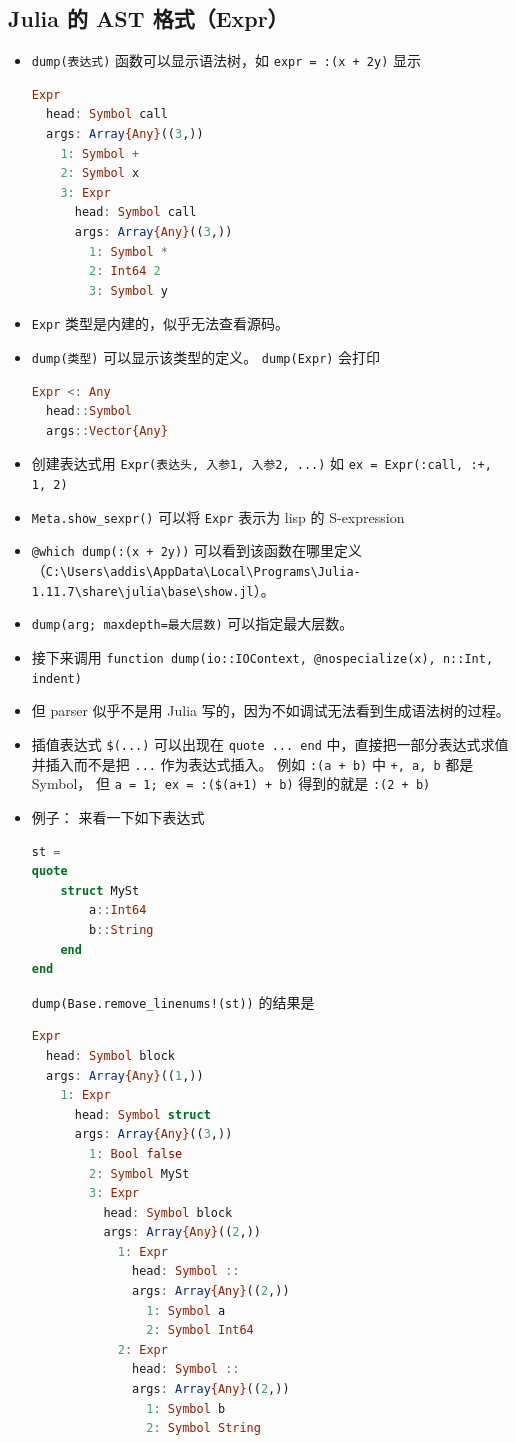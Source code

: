 \subsection{Julia 的 AST 格式（Expr）}
\begin{itemize}
\item \verb`dump(表达式)` 函数可以显示语法树，如 \verb`expr = :(x + 2y)` 显示
\begin{lstlisting}[language=julia]
Expr
  head: Symbol call
  args: Array{Any}((3,))
    1: Symbol +
    2: Symbol x
    3: Expr
      head: Symbol call
      args: Array{Any}((3,))
        1: Symbol *
        2: Int64 2
        3: Symbol y
\end{lstlisting}
\item \verb`Expr` 类型是内建的，似乎无法查看源码。
\item \verb`dump(类型)` 可以显示该类型的定义。 \verb`dump(Expr)` 会打印 
\begin{lstlisting}[language=julia]
Expr <: Any
  head::Symbol
  args::Vector{Any}
\end{lstlisting}
\item 创建表达式用 \verb`Expr(表达头, 入参1, 入参2, ...)` 如 \verb`ex = Expr(:call, :+, 1, 2)`
\item \verb`Meta.show_sexpr()` 可以将 \verb`Expr` 表示为 lisp 的 S-expression
\item \verb`@which dump(:(x + 2y))` 可以看到该函数在哪里定义（\verb`C:\Users\addis\AppData\Local\Programs\Julia-1.11.7\share\julia\base\show.jl`）。
\item \verb`dump(arg; maxdepth=最大层数)` 可以指定最大层数。
\item 接下来调用 \verb`function dump(io::IOContext, @nospecialize(x), n::Int, indent)`
\item 但 parser 似乎不是用 Julia 写的，因为不如调试无法看到生成语法树的过程。
\item 插值表达式 \verb`$(...)` 可以出现在 \verb`quote ... end` 中，直接把一部分表达式求值并插入而不是把 \verb`...` 作为表达式插入。 例如 \verb`:(a + b)` 中 \verb`+, a, b` 都是 Symbol， 但 \verb`a = 1; ex = :($(a+1) + b)` 得到的就是 \verb`:(2 + b)`
\item 例子：
来看一下如下表达式
\begin{lstlisting}[language=julia]
st = 
quote
    struct MySt
        a::Int64
        b::String
    end
end
\end{lstlisting}
\verb`dump(Base.remove_linenums!(st))` 的结果是
\begin{lstlisting}[language=julia]
Expr
  head: Symbol block
  args: Array{Any}((1,))
    1: Expr
      head: Symbol struct
      args: Array{Any}((3,))
        1: Bool false
        2: Symbol MySt
        3: Expr
          head: Symbol block
          args: Array{Any}((2,))
            1: Expr
              head: Symbol ::
              args: Array{Any}((2,))
                1: Symbol a
                2: Symbol Int64
            2: Expr
              head: Symbol ::
              args: Array{Any}((2,))
                1: Symbol b
                2: Symbol String
\end{lstlisting}
\end{itemize}


